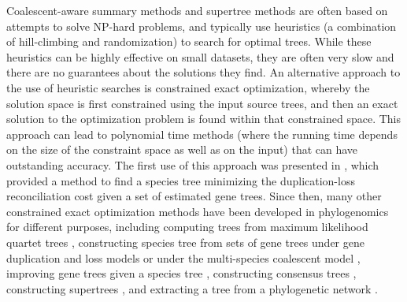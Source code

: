 Coalescent-aware summary methods and supertree methods are often based on attempts to solve NP-hard problems, and typically use heuristics  (a combination of hill-climbing and randomization) to search for optimal trees.
While these heuristics can be highly effective on small datasets, they are often very slow 
and there are no guarantees about the solutions they find.
An alternative approach to the use of heuristic searches is constrained exact optimization, whereby the solution space is first constrained using the input source trees, and then  an exact solution  to the optimization problem is found within that constrained space.
This approach can lead to polynomial time methods (where the running time depends on the size of the constraint space as well as on the input) that can have outstanding accuracy.
The first use of this approach was presented in   \cite{hallett2000new}, which provided a method to find a species tree minimizing the duplication-loss reconciliation cost given a set of estimated gene trees. 
Since then, many other constrained exact optimization methods have been developed in phylogenomics for different purposes, including  computing trees from maximum likelihood quartet trees \cite{bryant2001constructing}, constructing species tree  from sets of gene trees under gene duplication and loss models  \cite{bayzid2013inferring} or under the multi-species coalescent model \cite{ThanNakhleh2009,yu2011algorithms,mirarab2014astral,mirarab2015astral}, improving gene trees given a species tree  \cite{szollosi2013efficient}, constructing consensus trees \cite{bryant2001constructing}, 
constructing supertrees \cite{vachaspati2017fastrfs},  and extracting a tree from a phylogenetic network \cite{bryant2001constructing}.

 

